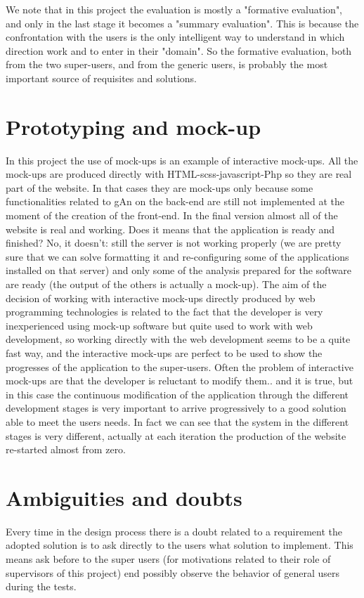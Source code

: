 We note that in this project the evaluation is mostly a "formative evaluation", and only in the last stage it becomes a "summary evaluation". This is because the confrontation with the users is the only intelligent way to understand in which direction work and to enter in their "domain". So the formative evaluation, both from the two super-users, and from the generic users, is probably the most important source of requisites and solutions.   

\section{Prototyping and mock-up}
In this project the use of mock-ups is an example of interactive mock-ups. All the mock-ups are produced directly with HTML-scss-javascript-Php so they are real part of the website. In that cases they are mock-ups only because some functionalities related to gAn on the back-end are still not implemented at the moment of the creation of the front-end. In the final version almost all of the website is real and working. Does it means that the application is ready and finished? No, it doesn't: still the server is not working properly (we are pretty sure that we can solve formatting it and re-configuring some of the applications installed on that server) and only some of the analysis prepared for the software are ready (the output of the others is actually a mock-up). The aim of the decision of working with interactive mock-ups directly produced by web programming technologies is related to the fact that the developer is very inexperienced using mock-up software but quite used to work with web development, so working directly with the web development seems to be a quite fast way, and the interactive mock-ups are perfect to be used to show the progresses of the application to the super-users.
Often the problem of interactive mock-ups are that the developer is reluctant to modify them.. and it is true, but in this case the continuous modification of the application through the different development stages is very important to arrive progressively to a good solution able to meet the users needs. In fact we can see that the system in the different stages is very different, actually at each iteration the production of the website re-started almost from zero. 

\section{Ambiguities and doubts}
Every time in the design process there is a doubt related to a requirement the adopted solution is to ask directly to the users what solution to implement. This means ask before to the super users (for motivations related to their role of supervisors of this project) end possibly observe the behavior of general 
users during the tests.

